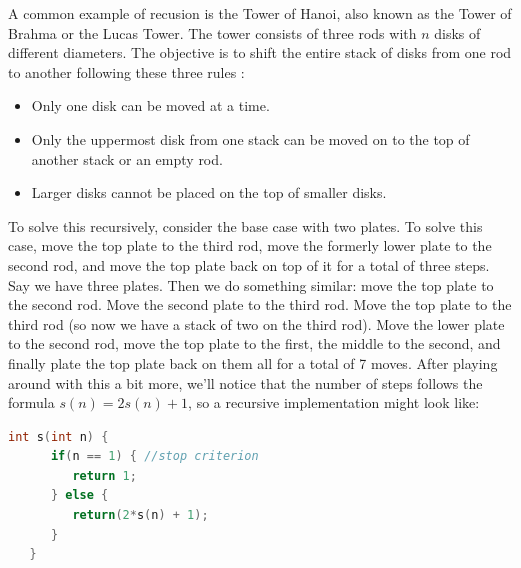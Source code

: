 \documentclass[nobib]{tufte-handout}
\begin{document}
A common example of recusion is the Tower of Hanoi, 
also known as the Tower of Brahma or the Lucas Tower. 
The tower consists of three 
rods with $n$ disks of different diameters.
The objective is to shift the entire 
stack of disks from one rod to another 
following these three rules :
\begin{itemize}
   \item Only one disk can be moved at a time.
   \item Only the uppermost disk from one stack 
   can be moved on to the top of another stack or an empty rod.
   \item Larger disks cannot be placed on the top of smaller disks.
\end{itemize}
To solve this recursively, consider the base case with two plates. 
To solve this case, move the top plate to the third rod, move the formerly
lower plate to the second rod, and move the top plate back on top of it
for a total of three steps. Say we have three plates. Then we do something similar: 
move the top plate to the second rod. Move the second plate to the third rod. 
Move the top plate to the third rod (so now we have a stack of two on the third rod). 
Move the lower plate to the second rod, move the top plate to the first, the middle 
to the second, and finally plate the top plate back on them all for a total of 
7 moves. After playing around with this a bit more, we'll notice that the number of 
steps follows the formula $s(n) = 2s(n) + 1$, so a recursive implementation might look like:
\begin{lstlisting}[language=C,caption=Tower of Hanoi]
   int s(int n) {
      if(n == 1) { //stop criterion
         return 1;
      } else {
         return(2*s(n) + 1);
      }
   }
\end{lstlisting}
\end{document}
